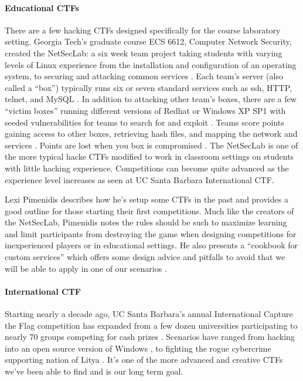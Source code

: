 \documentclass[10pt]{article}
\begin{document}
\paragraph*{Educational CTFs} There are a few hacking CTFs designed specifically
for the course laboratory setting. Georgia Tech's graduate course ECS 6612,
Computer Network Security, created the NetSecLab: a six week team project
taking students with varying levels of Linux experience from the installation
and configuration of an operating system, to securing and attacking common
services \cite{NetSecLab}. Each team's server (also called a ``box'') typically
runs six or seven standard services such as ssh, HTTP, telnet, and MySQL
\cite{NetSecLab}. In addition to attacking other team's boxes, there are a few
``victim boxes'' running different versions of Redhat or Windows XP SP1 with
seeded vulnerabilities for teams to search for and exploit \cite{NetSecLab}.
Teams score points gaining access to other boxes, retrieving hash files, and
mapping the network and services \cite{NetSecLab}. Points are lost when you box
is compromised \cite{NetSecLab}. The NetSecLab is one of the more typical hacke
CTFs modified to work in classroom settings on students with little hacking
experience. Competitions can become quite advanced as the experience level
increases as seen at UC Santa Barbara International CTF.

Lexi Pimenidis describes how he's setup some CTFs in the past
\cite{HostingHackingChallenge} and provides a good outline for those starting
their first competitions. Much like the creators of the NetSecLab, Pimenidis
notes the rules should be such to maximize learning and limit participants from
destroying the game when designing competitions for inexperienced players or in
educational settings. He also presents a ``cookbook for custom services'' which
offers some design advice and pitfalls to avoid that we will be able to apply
in one of our scenarios \cite{HostingHackingChallenge}.

\paragraph*{International CTF} Starting nearly a decade ago, UC Santa Barbara's
annual International Capture the Flag competition has expanded from a few dozen
universities participating to nearly 70 groups competing for cash prizes
\cite{2010iCTF}. Scenarios have ranged from hacking into an open source version
of Windows \cite{UCSBWindows}, to fighting the rogue cybercrime supporting
nation of Litya \cite{2010iCTF}. It's one of the more advanced and creative CTFs
we've been able to find and is our long term goal.
\end{document}
